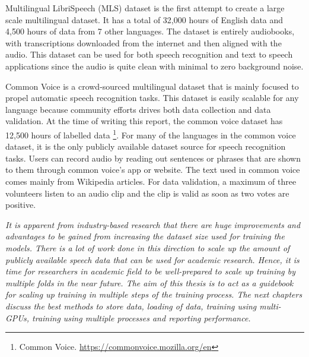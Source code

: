 Multilingual LibriSpeech (MLS) dataset is the first attempt to create a large scale multilingual dataset. It has a total of 32,000 hours of English data and 4,500 hours of data from 7 other languages. The dataset is entirely audiobooks, with  transcriptions downloaded from the internet and then aligned with the audio. This dataset can be used for both speech recognition and text to speech applications since the audio is quite clean with minimal to zero background noise. 

Common Voice \cite{ArdilaCommonCorpus} is a crowd-sourced multilingual dataset that is mainly focused to propel automatic speech recognition tasks. This dataset is easily scalable for any language because community efforts drives both data collection and data validation. At the time of writing this report, the common voice dataset has 12,500 hours of labelled data \footnote{Common Voice. \href{https://commonvoice.mozilla.org/en}{https://commonvoice.mozilla.org/en}}. For many of the languages in the common voice dataset, it is the only publicly available dataset source for speech recognition tasks. Users can record audio by reading out sentences or phrases that are shown to them through common voice's app or website. The text used in common voice comes mainly from Wikipedia articles. For data validation, a maximum of three volunteers listen to an audio clip and the clip is valid as soon as two votes are positive.

\emph{It is apparent from industry-based research that there are huge improvements and advantages to be gained from increasing the dataset size used for training the models. There is a lot of work done in this direction to scale up the amount of publicly available speech data that can be used for academic research. Hence, it is time for researchers in academic field to be well-prepared to scale up training by multiple folds in the near future. The aim of this thesis is to act as a guidebook for scaling up training in multiple steps of the training process. The next chapters discuss the best methods to store data, loading of data, training using multi-GPUs, training using multiple processes and reporting performance.}

